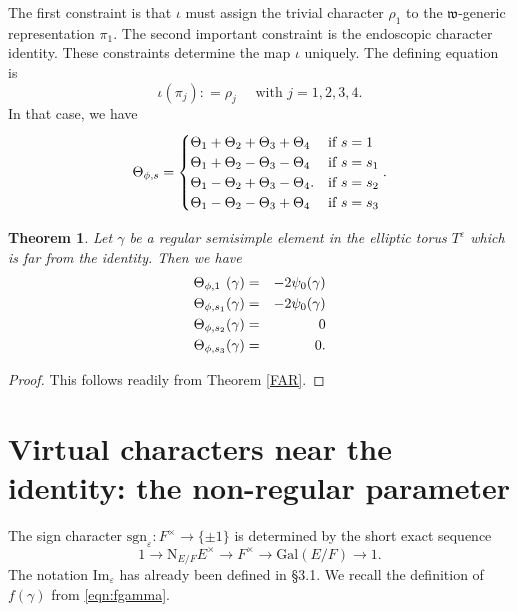 \documentclass[11pt]{amsart}
\numberwithin{equation}{section}
\newtheorem{thm}[equation]{Theorem}
\def\sgn{\mathrm{sgn}}
\def\fw{\mathfrak{w}}
\def\Gal{\mathrm{Gal}}
\def\rN{{\mathrm{N}}}
\newcommand{\<}{\left\langle}
\renewcommand{\>}{\right\rangle}
\begin{document}
The first constraint is that $\iota$ must assign the trivial character 
$\rho_1$ to the $\fw$-generic representation $\pi_1$.   The second important constraint is the endoscopic character identity.  
 These constraints determine the map $\iota$ uniquely.  The defining equation is
\begin{equation} 
\iota(\pi_j) : = \rho_j \quad \text{ with $j = 1,2,3,4$.}
\end{equation}
In that case, we have
\begin{equation} \label{eqn:endos}
\Theta_{\phi, s} =\begin{cases} \Theta_1 + \Theta_2 + \Theta_3 + \Theta_4 &\text{if $s = 1$}\\
 \Theta_1 + \Theta_2 - \Theta_3 - \Theta_4   &\text{if $ s = s_1$}\\
\Theta_1 - \Theta_2 + \Theta_3 - \Theta_4.   &\text{if $s = s_2$}\\
\Theta_1 - \Theta_2 - \Theta_3 + \Theta_4    &\text{if $s = s_3$}
\end{cases}.
\end{equation}


 \begin{thm}\label{FAR-NON-REG}  Let $\gamma$ be a regular semisimple element 
in the elliptic torus $T^\varepsilon$ which is far from the identity. Then we have
  \begin{eqnarray*}
\Theta_{\phi,1\hphantom{s}}(\gamma)  &=&  -2 \psi_0(\gamma)\\
 \Theta_{\phi, s_1}(\gamma)  &=& -2\psi_0(\gamma)\\
  \Theta_{\phi, s_2}(\gamma)  &=&  0\\
 \Theta_{\phi, s_3}(\gamma)  &=& 0.
 \end{eqnarray*}    
 \end{thm} 
 \begin{proof}   This follows readily from Theorem \ref{FAR}.   
 \end{proof}
 
 
 
   \section{Virtual characters near the identity: the non-regular parameter}  
 
 The sign character $\sgn_\varepsilon \colon F^\times \to \{\pm 1\}$ is determined by the short exact sequence
  \[
  1 \to \rN_{E/F}E^\times \to F^\times \to \Gal(E/F) \to 1.
  \]
  The notation $\mathrm{Im}_\varepsilon$ has already been defined in \S3.1.        
  We recall the definition of $f(\gamma)$ from \eqref{eqn:fgamma}.
    
\end{document}
